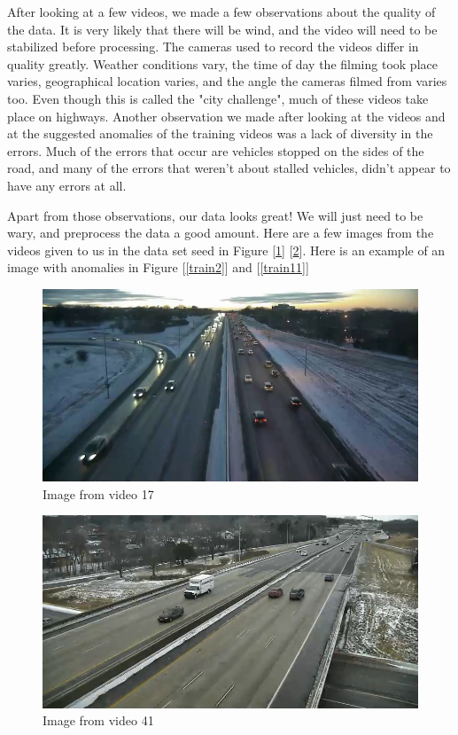 \documentclass[10pt,twocolumn,letterpaper]{article}
\begin{document}
After looking at a few videos, we made a few observations about the quality of the data. It is very likely that there will be wind, and the video will need to be stabilized before processing. The cameras used to record the videos differ in quality greatly. Weather conditions vary, the time of day the filming took place varies, geographical location varies, and the angle the cameras filmed from varies too. Even though this is called the "city challenge", much of these videos take place on highways. Another observation we made after looking at the videos and at the suggested anomalies of the training videos was a lack of diversity in the errors. Much of the errors that occur are vehicles stopped on the sides of the road, and many of the errors that weren't about stalled vehicles, didn't appear to have any errors at all.

Apart from those observations, our data looks great! We will just need to be wary, and preprocess the data a good amount. Here are a few images from the videos given to us in the data set seed in Figure [\ref{train17}] [\ref{train41}]. Here is an example of an image with anomalies in Figure [\ref{train2}] and [\ref{train11}]

\begin{figure}  
    \includegraphics[scale=.29]{images/anomalyTrain17.png}
    \caption{Image from video 17}
    \label{train17}
\end{figure}

\begin{figure}  
    \includegraphics[scale=.29]{images/anomalyTrain41.png}
    \caption{Image from video 41}
    \label{train41}
\end{figure}
\end{document}
